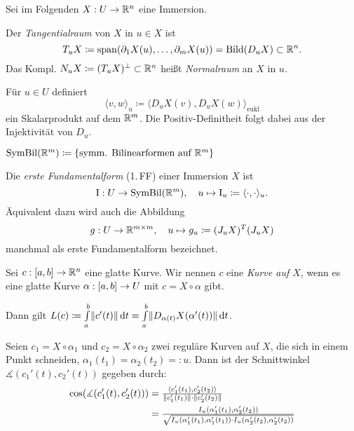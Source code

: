 \documentclass{cheat-sheet}
\newcommand{\Intabdt}[1]{\Int{a}{b}{#1}{t}}
\DeclareMathOperator{\SymBil}{SymBil} %
\newcommand{\FFI}{\mathrm{I}} %
\DeclareMathOperator{\Span}{span} %
\begin{document}
\begin{nota}
  Sei im Folgenden $X : U \to \mathbb{R}^n$ eine Immersion.
\end{nota}

\begin{defn}
  Der \emph{Tangentialraum} von $X$ in $u \in X$ ist
  \[ T_u X \coloneqq \Span(\partial_1 X(u), \ldots, \partial_m X(u)) = \mathrm{Bild}(D_u X) \subset \R^n. \]
  Das Kompl. $N_u X \coloneqq (T_u X)^\perp \subset \mathbb{R}^n$ heißt \emph{Normalraum} an $X$ in $u$.
\end{defn}

\begin{bem}
  Für $u \in U$ definiert
  \[ \langle v, w \rangle_u \coloneqq \langle D_u X(v), D_u X(w) \rangle_{\mathrm{eukl}} \]
  ein Skalarprodukt auf dem $\mathbb{R}^m$. Die Positiv-Definitheit folgt dabei aus der Injektivität von $D_u$.
\end{bem}

\begin{nota}
  $\SymBil(\R^m) \coloneqq \{ \text{symm. Bilinearformen auf $\R^m$} \}$
\end{nota}

\begin{defn}
  Die \emph{erste Fundamentalform} (1.\,FF) einer Immersion $X$ ist
  \[ \FFI : U \to \SymBil(\R^m), \quad u \mapsto \FFI_u \coloneqq \langle \cdot , \cdot \rangle_u. \]
  Äquivalent dazu wird auch die Abbildung
  \[ g : U \to \mathbb{R}^{m \times m}, \quad u \mapsto g_u \coloneqq (J_u X)^T (J_u X) \]
  manchmal als erste Fundamentalform bezeichnet.
\end{defn}

\begin{defn}
  Sei $c : \left[ a, b \right] \to \mathbb{R}^n$ eine glatte Kurve. Wir nennen $c$ eine \emph{Kurve auf $X$}, wenn es eine glatte Kurve $\alpha : \left[ a, b \right] \to U$ mit $c = X \circ \alpha$ gibt.
\end{defn}

\begin{bem}
  Dann gilt $L(c) \coloneqq \Intabdt{\norm{c'(t)}} = \Intabdt{\norm{D_{\alpha(t)} X(\alpha'(t))}}$.
\end{bem}

\begin{bem}
  Seien $c_1 = X \circ \alpha_1$ und $c_2 = X \circ \alpha_2$ zwei reguläre Kurven auf $X$, die sich in einem Punkt schneiden, \dh{} $\alpha_1(t_1) = \alpha_2(t_2) =: u$. Dann ist der Schnittwinkel $\measuredangle(c_1'(t), c_2'(t))$ gegeben durch:
  \begin{align*}
    \cos(\measuredangle(c_1'(t), c_2'(t))) &= \tfrac{\langle c_1'(t_1) , c_2'(t_2) \rangle}{\lVert c_1'(t_1)\rVert \cdot \lVert c_2'(t_2)\rVert} \\
    &= \tfrac{I_u(\alpha_1'(t_1), \alpha_2'(t_2))}{\sqrt{I_u(\alpha_1'(t_1), \alpha_1'(t_1)) \cdot I_u(\alpha_2'(t_2), \alpha_2'(t_2))}}
  \end{align*}
\end{bem}
\end{document}
